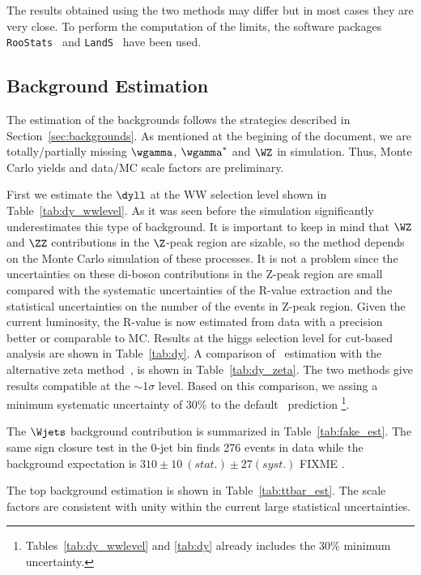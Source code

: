 The results obtained using the two methods may differ but in most cases
they are very close. To perform the computation of the limits, the
software packages
\texttt{RooStats}~\cite{rootstat} and \texttt{LandS}~\cite{lands} have 
been used.

\subsection{Background Estimation}

The estimation of the backgrounds follows the strategies described in
Section~\ref{sec:backgrounds}. As mentioned at the begining of the 
document, we are totally/partially missing $\wgamma$, $\wgamma^{*}$ and $\WZ$
in simulation. Thus, Monte Carlo yields and data/MC scale factors 
are preliminary.

First we estimate the $\dyll$ at the WW selection level shown in Table~\ref{tab:dy_wwlevel}. 
As it was seen before the simulation significantly underestimates this type of
background. It is important to keep in mind that $\WZ$ and $\ZZ$ 
contributions in the $\Z$-peak region are sizable, so the method depends
on the Monte Carlo simulation of these processes. It is not a problem
since the uncertainties on these di-boson contributions in the Z-peak
region are small compared with the systematic uncertainties of the
R-value extraction and the statistical uncertainties on the number of
the events in Z-peak region. 
Given the current luminosity, the R-value is now estimated from data with a precision better or comparable to MC.
Results at the higgs selection level for cut-based analysis are shown in Table~\ref{tab:dy}. 
A comparison of \dyll\ estimation with the alternative zeta method~\cite{ZetaNote},\cite{ichep2012Note} 
is shown in Table~\ref{tab:dy_zeta}. The two methods give results compatible at the $\sim$1$\sigma$ level.
Based on this comparison, we assing a minimum systematic uncertainty of 30\% to the default \dyll\ prediction
\footnote{Tables~\ref{tab:dy_wwlevel} and \ref{tab:dy} already includes the 30\% minimum uncertainty.}. 

The $\Wjets$ background contribution is summarized in Table~\ref{tab:fake_est}. 
The same sign closure test in the 0-jet bin finds 276 events in data while 
the background expectation is $310 \pm 10~(stat.) \pm 27 (syst.)$ FIXME  .

The top background estimation is shown in
Table~\ref{tab:ttbar_est}. The scale factors are consistent with unity within 
the current large statistical uncertainties. 

